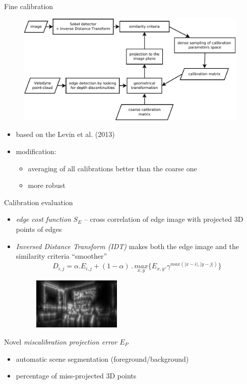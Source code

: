 \documentclass[pdf]{beamer}
\begin{document}
	\begin{frame}{Fine calibration}
		\begin{figure}[h]
			\center
			\includegraphics[width=0.99\textwidth]{fig/framework.pdf}
		\end{figure}
		\begin{itemize}
			\item based on the Levin et al. (2013)
			\item modification:
			\begin{itemize}
				\item averaging of all calibrations better than the coarse one
				\item more robust
			\end{itemize}
		\end{itemize}
	\end{frame}	

	\begin{frame}{Calibration evaluation}
		\begin{itemize}
			\item \emph{edge cost function} $S_E$ -- cross correlation of edge image with projected $3$D points of edges
			\item \emph{Inversed Distance Transform (IDT)} makes both the edge image and the similarity criteria ``smoother''
			$$
				D_{i,j} = \alpha . E_{i,j} + (1-\alpha)\,.\,\underset{x,y}{max}\{ E_{x,y} . \gamma^{max(\vert x-i \vert, \vert y-j \vert)}\}
			$$
			\begin{figure}[h]
				\center
				\includegraphics[width=0.4\textwidth]{fig/edges_idt.png}
			\end{figure}
		\end{itemize}
		
		\begin{block}{Novel \emph{miscalibration projection error} $E_P$}
			\begin{itemize}
				\item automatic scene segmentation (foreground/background)
				\item percentage of miss-projected $3$D points
			\end{itemize}
		\end{block}
	
	\end{frame}
	
\end{document}
